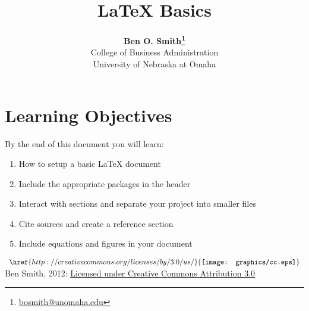 \documentclass[11pt]{article}
\begin{document}
 

\title{LaTeX Basics}
\date{}
\author{\textbf{Ben O. Smith\footnote{\href{mailto:bosmith@unomaha.edu}{bosmith@unomaha.edu}}} \\
College of Business Administration \\
University of Nebraska at Omaha}
\maketitle 

\section*{Learning Objectives}

By the end of this document you will learn:

\begin{enumerate}
	\item How to setup a basic LaTeX document
	\item Include the appropriate packages in the header
	\item Interact with sections and separate your project into smaller files
	\item Cite sources and create a reference section
	\item Include equations and figures in your document
\end{enumerate}

\doublespace







\printbibliography[title=Bibliography]
\vspace{\fill}
\noindent $ \begin{array}{l} \href{http://creativecommons.org/licenses/by/3.0/us/}{\texttt{[image: graphics/cc.eps]}} \end{array} $ Ben Smith, 2012: \href{http://creativecommons.org/licenses/by/3.0/us/}{Licensed under Creative Commons Attribution 3.0}
\end{document}
